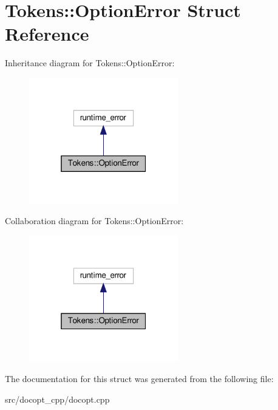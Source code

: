 \hypertarget{structTokens_1_1OptionError}{}\section{Tokens\+:\+:Option\+Error Struct Reference}
\label{structTokens_1_1OptionError}


Inheritance diagram for Tokens\+:\+:Option\+Error\+:
\nopagebreak
\begin{figure}[H]
\begin{center}
\leavevmode
\includegraphics[width=184pt]{structTokens_1_1OptionError__inherit__graph}
\end{center}
\end{figure}


Collaboration diagram for Tokens\+:\+:Option\+Error\+:
\nopagebreak
\begin{figure}[H]
\begin{center}
\leavevmode
\includegraphics[width=184pt]{structTokens_1_1OptionError__coll__graph}
\end{center}
\end{figure}


The documentation for this struct was generated from the following file\+:\begin{DoxyCompactItemize}
\item 
src/docopt\+\_\+cpp/docopt.\+cpp\end{DoxyCompactItemize}
